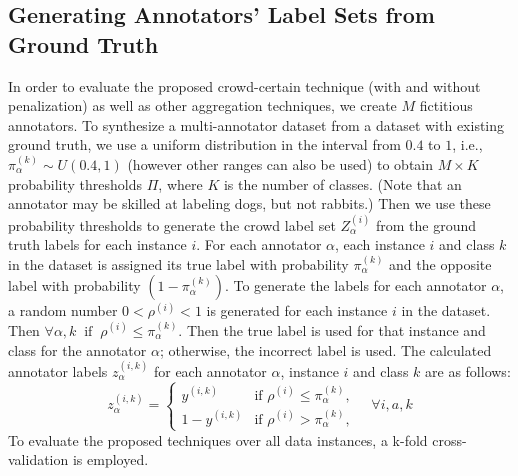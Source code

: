 \subsection{Generating Annotators' Label Sets from Ground Truth}\label{subsec:methods.generating_fictitious_labelset}
In order to evaluate the proposed crowd-certain technique (with and without penalization) as well as other aggregation techniques, we create $M$ fictitious annotators. To synthesize a multi-annotator dataset from a dataset with existing ground truth, we use a uniform distribution in the interval from $0.4 $ to $1 $, i.e., $\pi_\alpha^{(k)} \sim U\left(0.4,1\right) $ (however other ranges can also be used) to obtain $M \times  K$ probability thresholds $\Pi $, where $K$ is the number of classes. (Note that
an annotator may be skilled at labeling dogs, but not rabbits.) Then we use these probability thresholds to generate the crowd label set $Z_{\alpha}^{(i)} $ from the ground truth labels for each instance $i $.
For each annotator $\alpha $, each instance $i $ and class $k $ in the dataset is assigned its true label with probability $\pi_\alpha^{(k)}$ and the opposite label with probability $ (1-\pi_\alpha^{(k)})$. To generate the labels for each annotator $\alpha $, a random number $0 < \rho^{(i)} < 1 $ is generated for each instance $i $ in the dataset. Then $\forall \alpha,k \; \; \text{if} \; \; \rho^{(i)}\leq \pi_\alpha^{(k)}$. Then the true label is used for that instance and class for the annotator $\alpha $; otherwise, the incorrect label is used.
The calculated annotator labels $z_{\alpha}^{(i,k)} $ for each annotator $\alpha $, instance $i $ and class $k $ are as follows:
\begin{equation}
    z_{\alpha}^{(i,k)} =
    \begin{cases}
        y^{(i,k)} & \text{if } \rho^{(i)}  \leq \pi_\alpha^{(k)} , \\
        1 - y^{(i,k)} & \text{if } \rho^{(i)} > \pi_\alpha^{(k)} ,
    \end{cases} \quad \forall i, a, k
    \label{eq:crowd.Eq.4.fictitious_label}
\end{equation}
To evaluate the proposed techniques over all data instances, a k-fold cross-validation is employed.

